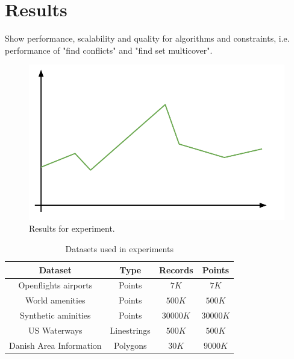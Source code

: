 \section{Results}
Show performance, scalability and quality for algorithms and constraints, i.e. performance of "find conflicts" and "find set multicover".

\begin{figure}[htbp]
\begin{center}
\includegraphics[scale=.5]{figs/cvl_todo.pdf}
\caption{Results for experiment.}
\label{fig:results-x}
\end{center}
\end{figure}

\begin{table}[htdp]
\caption{Datasets used in experiments}
\begin{center}
\begin{tabular}{|c|c|c|c|}
\hline
\textbf{Dataset} & \textbf{Type} & \textbf{Records} & \textbf{Points} \\
\hline
Openflights airports & Points & $7K$ & $7K$ \\
World amenities & Points & $500K$ & $500K$ \\
Synthetic aminities & Points & $30000K$ & $30000K$ \\
US Waterways & Linestrings & $500K$ & $500K$ \\
Danish Area Information & Polygons & $30K$ & $9000K$ \\
\hline
\end{tabular}
\end{center}
\label{default}
\end{table}%
